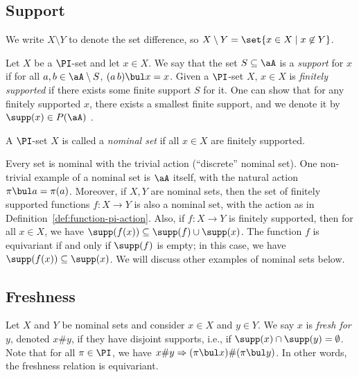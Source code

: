 \documentclass[twoside,11pt]{entics}
\begin{document}
\subsection{Support}

We write $X\setminus Y$ to denote the set difference, so $X\setminus
Y=\set{x\in X\mid x\not\in Y}$.

\begin{xdefinition}
  Let $X$ be a $\PI$-set and let $x\in X$. We say that the set
  $S\subseteq \aA$ is a \emph{support} for $x$ if for all $a,b\in
  \aA\setminus S$, $(a\,b) \bul x=x$. Given a $\PI$-set $X$,
  $x\in X$ is \emph{finitely supported} if there exists some finite
  support $S$ for it. One can show that for any finitely supported
  $x$, there exists a smallest finite support, and we denote it by
  $\supp(x)\in P(\aA)$ \cite{Pitts2013}.
\end{xdefinition}

\begin{xdefinition}
  A $\PI$-set $X$ is called a \emph{nominal set} if all $x\in X$ are
  finitely supported.
\end{xdefinition}

\noindent Every set is nominal with the trivial action (``discrete''
nominal set). One non-trivial example of a nominal set is $\aA$
itself, with the natural action $\pi\bul a=\pi(a)$. Moreover, if $X,Y$
are nominal sets, then the set of finitely supported functions
$f : X \to Y$ is also a nominal set, with the action as in
Definition~\ref{def:function-pi-action}. Also, if $f:X\to Y$ is
finitely supported, then for all $x\in X$, we have
$\supp(f(x)) \subseteq \supp(f) \cup \supp(x)$. The function $f$ is
equivariant if and only if $\supp(f)$ is empty; in this case, we have
$\supp(f(x)) \subseteq \supp(x)$. We will discuss other examples of
nominal sets below.

\subsection{Freshness}

Let $X$ and $Y$ be nominal sets and consider $x\in X$ and $y\in Y$. We
say $x$ is \emph{fresh for} $y$, denoted $x\# y$, if they have
disjoint supports, i.e., if $\supp(x) \cap \supp(y) = \emptyset$.
Note that for all $\pi \in \PI$, we have $x\# y \Rightarrow (\pi
\bul x) \# (\pi \bul y)$. In other words, the freshness relation
is equivariant.
\end{document}
